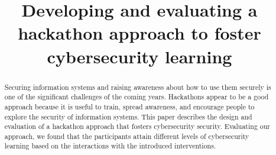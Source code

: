\documentclass[runningheads]{llncs}
\begin{document}
%
\title{Developing and evaluating a hackathon approach to foster cybersecurity learning}
%
%

%
\authorrunning{}
%
\maketitle              %
%
\begin{abstract}
Securing information systems and raising awareness about how to use them securely is one of the significant challenges of the coming years. Hackathons appear to be a good approach because it is useful to train, spread awareness, and encourage people to explore the security of information systems. This paper describes the design and evaluation of a hackathon approach that fosters cybersecurity security. 
Evaluating our approach, we found that the participants attain different levels of cybersecurity learning based on the interactions with the introduced interventions.
\end{abstract}
%
%
\end{document}
